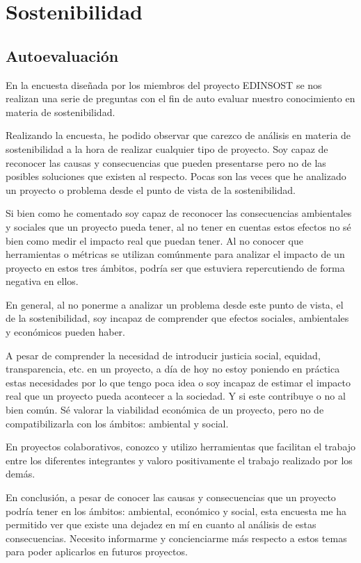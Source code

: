\documentclass[titlepage,12pt]{report}
\begin{document}
\section{Sostenibilidad}

\subsection{Autoevaluación}

En la encuesta diseñada por los miembros del proyecto EDINSOST se nos realizan una serie de preguntas con el fin de auto evaluar nuestro conocimiento en materia de sostenibilidad.

Realizando la encuesta, he podido observar que carezco de análisis en materia de sostenibilidad a la hora de realizar cualquier tipo de proyecto. Soy capaz de reconocer las causas y consecuencias que pueden presentarse pero no de las posibles soluciones que existen al respecto. Pocas son las veces que he analizado un proyecto o problema desde el punto de vista de la sostenibilidad.

Si bien como he comentado soy capaz de reconocer las consecuencias ambientales y sociales que un proyecto pueda tener, al no tener en cuentas estos efectos no sé bien como medir el impacto real que puedan tener. Al no conocer que herramientas o métricas se utilizan comúnmente para analizar el impacto de un proyecto en estos tres ámbitos, podría ser que estuviera repercutiendo de forma negativa en ellos.

En general, al no ponerme a analizar un problema desde este punto de vista, el de la sostenibilidad, soy incapaz de comprender que efectos sociales, ambientales y económicos pueden haber.

A pesar de comprender la necesidad de introducir justicia social, equidad, transparencia, etc. en un proyecto, a día de hoy no estoy poniendo en práctica estas necesidades por lo que tengo poca idea o soy incapaz de estimar el impacto real que un proyecto pueda acontecer a la sociedad. Y si este contribuye o no al bien común.
Sé valorar la viabilidad económica de un proyecto, pero no de compatibilizarla con los ámbitos: ambiental y social.

En proyectos colaborativos, conozco y utilizo herramientas que facilitan el trabajo entre los diferentes integrantes y valoro positivamente el trabajo realizado por los demás.

En conclusión, a pesar de conocer las causas y consecuencias que un proyecto podría tener en los ámbitos: ambiental, económico y social, esta encuesta me ha permitido ver que existe una dejadez en mí en cuanto al análisis de estas consecuencias. Necesito informarme y concienciarme más respecto a estos temas para poder aplicarlos en futuros proyectos.
\end{document}
